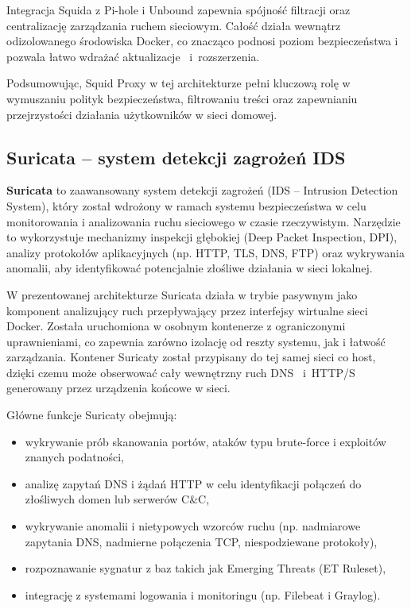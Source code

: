 \documentclass[
    left=2.5cm,         %
    right=2.5cm,        %
    top=2.5cm,          %
    bottom=3cm,         %
    bindingoffset=6mm,  %
    nohyphenation=true %
]{eiti/eiti-thesis} %
\begin{document}
Integracja Squida z Pi-hole i Unbound zapewnia spójność filtracji oraz centralizację zarządzania ruchem sieciowym. Całość działa wewnątrz odizolowanego środowiska Docker, co znacząco podnosi poziom bezpieczeństwa i pozwala łatwo wdrażać aktualizacje ~i~rozszerzenia.

Podsumowując, Squid Proxy w tej architekturze pełni kluczową rolę w wymuszaniu polityk bezpieczeństwa, filtrowaniu treści oraz zapewnianiu przejrzystości działania użytkowników w sieci domowej.

\subsection{Suricata – system detekcji zagrożeń IDS}

\textbf{Suricata}\cite{suricata-wiki} to zaawansowany system detekcji zagrożeń (IDS – Intrusion Detection System), który został wdrożony w ramach systemu bezpieczeństwa w celu monitorowania i analizowania ruchu sieciowego w czasie rzeczywistym. Narzędzie to wykorzystuje mechanizmy inspekcji głębokiej (Deep Packet Inspection, DPI), analizy protokołów aplikacyjnych (np. HTTP, TLS, DNS, FTP) oraz wykrywania anomalii, aby identyfikować potencjalnie złośliwe działania w sieci lokalnej\cite{suricata-docs}.

W prezentowanej architekturze Suricata\cite{config-suricata} działa w trybie pasywnym jako komponent analizujący ruch przepływający przez interfejsy wirtualne sieci Docker. Została uruchomiona w osobnym kontenerze z ograniczonymi uprawnieniami, co zapewnia zarówno izolację od reszty systemu, jak i łatwość zarządzania. Kontener Suricaty został przypisany do tej samej sieci co host, dzięki czemu może obserwować cały wewnętrzny ruch DNS ~i~HTTP/S generowany przez urządzenia końcowe 
w sieci\cite{suricata-docs}.

Główne funkcje Suricaty obejmują:
\begin{itemize}
    \item wykrywanie prób skanowania portów, ataków typu brute-force i exploitów znanych podatności,
    \item analizę zapytań DNS i żądań HTTP w celu identyfikacji połączeń do złośliwych domen lub serwerów C\&C,
    \item wykrywanie anomalii i nietypowych wzorców ruchu (np. nadmiarowe zapytania DNS, nadmierne połączenia TCP, niespodziewane protokoły),
    \item rozpoznawanie sygnatur z baz takich jak Emerging Threats (ET Ruleset),
    \item integrację z systemami logowania i monitoringu (np. Filebeat i Graylog).
\end{itemize}
\end{document}
